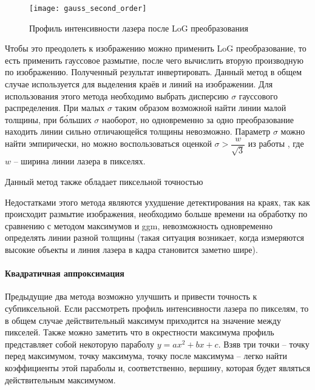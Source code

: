                 \begin{wrapfigure}{r}{0.4\linewidth}
                    \centering
                    \texttt{[image: gauss\_second\_order]}
                    \caption{Профиль интенсивности лазера после LoG преобразования}
                \end{wrapfigure}
                Чтобы это преодолеть к изображению можно применить LoG преобразование, то есть применить гауссовое размытие, после чего вычислить вторую производную по изображению. Полученный результат инвертировать. Данный метод в общем случае используется для выделения краёв и линий на изображении\cite{Steger2000}. Для использования этого метода необходимо выбрать дисперсию $ \sigma $ гауссового распределения. При малых $ \sigma $ таким образом возможной найти линии малой толщины, при б\'{о}льших $ \sigma $ наоборот, но одновременно за одно преобразование находить линии сильно отличающейся толщины невозможно.
                Параметр $ \sigma $ можно найти эмпирически, но можно воспользоваться оценкой $ \sigma > \dfrac{w}{\sqrt{3}} $ из работы \cite{Steger2000}, где $ w $ -- ширина линии лазера в пикселях.
                
                Данный метод также обладает пиксельной точностью
                
                Недостатками этого метода являются ухудшение детектирования на краях, так как происходит размытие изображения, необходимо больше времени на обработку по сравнению с методом максимумов и ggm, невозможность одновременно определять линии разной толщины (такая ситуация возникает, когда измеряются высокие объекты и линия лазера в кадра становится заметно шире).

            
            \paragraph{Квадратичная аппроксимация}
                Предыдущие два метода возможно улучшить и привести точность к субпиксельной\cite{Molder2014}. Если рассмотреть профиль интенсивности лазера по пикселям, то в общем случае действительный максимум приходится на значение между пикселей. Также можно заметить что в окрестности максимума профиль представляет собой некоторую параболу $ y = ax^2 + bx + c $. Взяв три точки -- точку перед максимумом, точку максимума, точку после максимума -- легко найти коэффициенты этой параболы и, соответственно, вершину, которая будет являться действительным максимумом.
                
